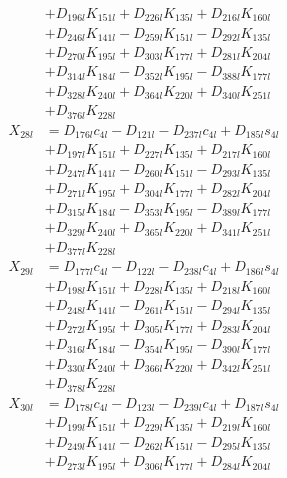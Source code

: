 \begin{multicols}{2}
\begin{align}
&+ D_{196l}K_{151l} + D_{226l}K_{135l} + D_{216l}K_{160l}  \nonumber \\
&+ D_{246l}K_{141l} - D_{259l}K_{151l} - D_{292l}K_{135l}  \nonumber \\
&+ D_{270l}K_{195l} + D_{303l}K_{177l} + D_{281l}K_{204l}  \nonumber \\
&+ D_{314l}K_{184l} - D_{352l}K_{195l} - D_{388l}K_{177l}  \nonumber \\
&+ D_{328l}K_{240l} + D_{364l}K_{220l} + D_{340l}K_{251l}  \nonumber \\
&+ D_{376l}K_{228l} \nonumber \\
X_{28l} &= D_{176l}c_{4l} - D_{121l} - D_{237l}c_{4l} + D_{185l}s_{4l}  \nonumber \\
&+ D_{197l}K_{151l} + D_{227l}K_{135l} + D_{217l}K_{160l}  \nonumber \\
&+ D_{247l}K_{141l} - D_{260l}K_{151l} - D_{293l}K_{135l}  \nonumber \\
&+ D_{271l}K_{195l} + D_{304l}K_{177l} + D_{282l}K_{204l}  \nonumber \\
&+ D_{315l}K_{184l} - D_{353l}K_{195l} - D_{389l}K_{177l}  \nonumber \\
&+ D_{329l}K_{240l} + D_{365l}K_{220l} + D_{341l}K_{251l}  \nonumber \\
&+ D_{377l}K_{228l} \nonumber \\
X_{29l} &= D_{177l}c_{4l} - D_{122l} - D_{238l}c_{4l} + D_{186l}s_{4l}  \nonumber \\
&+ D_{198l}K_{151l} + D_{228l}K_{135l} + D_{218l}K_{160l}  \nonumber \\
&+ D_{248l}K_{141l} - D_{261l}K_{151l} - D_{294l}K_{135l}  \nonumber \\
&+ D_{272l}K_{195l} + D_{305l}K_{177l} + D_{283l}K_{204l}  \nonumber \\
&+ D_{316l}K_{184l} - D_{354l}K_{195l} - D_{390l}K_{177l}  \nonumber \\
&+ D_{330l}K_{240l} + D_{366l}K_{220l} + D_{342l}K_{251l}  \nonumber \\
&+ D_{378l}K_{228l} \nonumber \\
X_{30l} &= D_{178l}c_{4l} - D_{123l} - D_{239l}c_{4l} + D_{187l}s_{4l}  \nonumber \\
&+ D_{199l}K_{151l} + D_{229l}K_{135l} + D_{219l}K_{160l}  \nonumber \\
&+ D_{249l}K_{141l} - D_{262l}K_{151l} - D_{295l}K_{135l}  \nonumber \\
&+ D_{273l}K_{195l} + D_{306l}K_{177l} + D_{284l}K_{204l}  \nonumber \\

\end{align}
\end{multicols}
